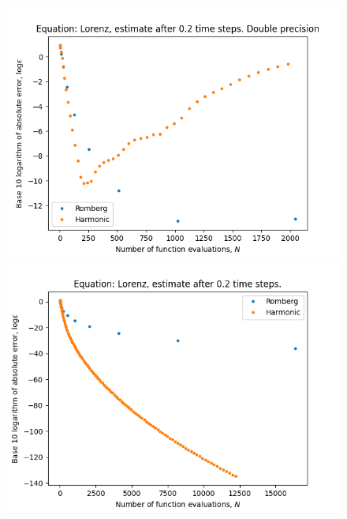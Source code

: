 \begin{figure}[H]
\centering
\begin{minipage}{0.45\textwidth}
\centering
\includegraphics[scale=0.45]{../results/emr_plots/lorenz_02.png}
\end{minipage}
\begin{minipage}{0.45\textwidth}
\centering
\includegraphics[scale=0.45]{../results/emr_plots/lorenz_02_hp.png}
\end{minipage}
\end{figure}

